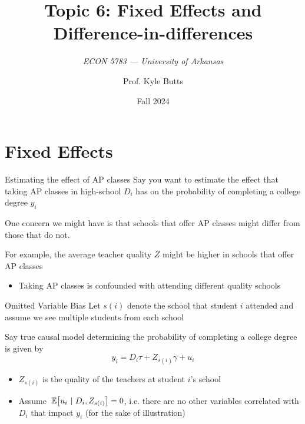 \documentclass[aspectratio=169,t,11pt,table]{beamer}
\title{Topic 6: Fixed Effects and Difference-in-differences}
\subtitle{\it  ECON 5783 — University of Arkansas}
\date{Fall 2024}
\author{Prof. Kyle Butts}
\begin{document}
\begin{frame}
\maketitle

\end{frame}

\section{Fixed Effects}

\begin{frame}{Estimating the effect of AP classes}
  Say you want to estimate the effect that taking AP classes in high-school $D_i$ has on the probability of completing a college degree $y_i$
  
  \bigskip
  One concern we might have is that schools that offer AP classes might differ from those that do not. 
  
  \pause
  \bigskip
  For example, the average teacher quality $Z$ might be higher in schools that offer AP classes
  \begin{itemize}
    \item Taking AP classes is confounded with attending different quality schools
  \end{itemize}
\end{frame}

\begin{frame}{Omitted Variable Bias}
  Let $s(i)$ denote the school that student $i$ attended and assume we see multiple students from each school

  \pause
  \bigskip
  Say true causal model determining the probability of completing a college degree is given by
  $$
    y_i = D_i \tau + Z_{s(i)} \gamma + u_i
  $$
  
  \begin{itemize}
    \item $Z_{s(i)}$ is the quality of the teachers at student $i$'s school
    
    \item Assume $\expec{u_i}{D_i, Z_{s(i)}} = 0$, i.e. there are no other variables correlated with $D_i$ that impact $y_i$ (for the sake of illustration)
  \end{itemize}
\end{frame}
\end{document}
